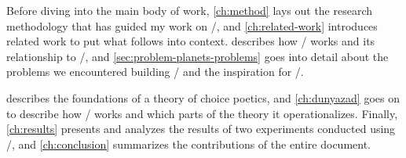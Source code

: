 
Before diving into the main body of work, \cref{ch:method} lays out the research methodology that has guided my work on \dunyazad/, and \cref{ch:related-work} introduces related work to put what follows into context.
%
 describes how \skald/ works and its relationship to \minstrel/, and \cref{sec:problem-planets-problems} goes into detail about the problems we encountered building \problemplanets/ and the inspiration for \dunyazad/.


 describes the foundations of a theory of choice poetics, and \cref{ch:dunyazad} goes on to describe how \dunyazad/ works and which parts of the theory it operationalizes.
%
Finally, \cref{ch:results} presents and analyzes the results of two experiments conducted using \dunyazad/, and \cref{ch:conclusion} summarizes the contributions of the entire document.
